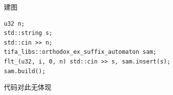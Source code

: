 建图

\begin{verbatim}
u32 n;
std::string s;
std::cin >> n;
tifa_libs::orthodox_ex_suffix_automaton sam;
flt_(u32, i, 0, n) std::cin >> s, sam.insert(s);
sam.build();
\end{verbatim}

代码对此无体现

